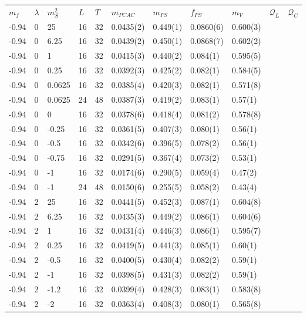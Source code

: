 \begin{table}
\begin{adjustwidth}{-4em}{-4em}
\begin{tabular}{l  l l l l l l l l l l}
\toprule
$m_f$ & $\lambda$ & $m_S^2$ & $L$ & $T$ & $m_{PCAC}$ & $m_{PS}$ & $f_{PS}$ & $m_V$ & $\mathcal Q_L$ & $\mathcal Q_C$ \\ 
\hhline{===========}
-0.94 & 0 & 25 & 16 & 32 & 0.0435(2) & 0.449(1) & 0.0860(6) & 0.600(3) \\
-0.94 & 0 & 6.25 & 16 & 32 & 0.0439(2) & 0.450(1) & 0.0868(7) & 0.602(2)\\
-0.94 & 0 & 1 & 16 & 32 & 0.0415(3) & 0.440(2) & 0.084(1) & 0.595(5)\\
-0.94 & 0 & 0.25 & 16 & 32 & 0.0392(3) & 0.425(2) & 0.082(1) & 0.584(5)\\
-0.94 & 0 & 0.0625 & 16 & 32 & 0.0385(4) & 0.420(3) & 0.082(1) & 0.571(8)\\
-0.94 & 0 & 0.0625 & 24 & 48 & 0.0387(3) & 0.419(2) & 0.083(1) & 0.57(1)\\
-0.94 & 0 & 0 & 16 & 32 & 0.0378(6) & 0.418(4) & 0.081(2) & 0.578(8)\\
-0.94 & 0 & -0.25 & 16 & 32 & 0.0361(5) & 0.407(3) & 0.080(1) & 0.56(1)\\
-0.94 & 0 & -0.5 & 16 & 32 & 0.0342(6) & 0.396(5) & 0.078(2) & 0.56(1)\\
-0.94 & 0 & -0.75 & 16 & 32 & 0.0291(5) & 0.367(4) & 0.073(2) & 0.53(1)\\
-0.94 & 0 & -1 & 16 & 32 & 0.0174(6) & 0.290(5) & 0.059(4) & 0.47(2)\\
-0.94 & 0 & -1 & 24 & 48 & 0.0150(6) & 0.255(5) & 0.058(2) & 0.43(4)\\
\midrule
-0.94 & 2 & 25 & 16 & 32 & 0.0441(5) & 0.452(3) & 0.087(1) & 0.604(8)\\
-0.94 & 2 & 6.25 & 16 & 32 & 0.0435(3) & 0.449(2) & 0.086(1) & 0.604(6)\\
-0.94 & 2 & 1 & 16 & 32 & 0.0431(4) & 0.446(3) & 0.086(1) & 0.595(7)\\
-0.94 & 2 & 0.25 & 16 & 32 & 0.0419(5) & 0.441(3) & 0.085(1) & 0.60(1) \\
-0.94 & 2 & -0.5 & 16 & 32 & 0.0400(5) & 0.430(4) & 0.082(2) & 0.59(1)\\
-0.94 & 2 & -1 & 16 & 32 & 0.0398(5) & 0.431(3) & 0.082(2) & 0.59(1)\\
-0.94 & 2 & -1.2 & 16 & 32 & 0.0399(4) & 0.428(3) & 0.083(1) & 0.583(8)\\
-0.94 & 2 & -2 & 16 & 32 & 0.0363(4) & 0.408(3) & 0.080(1) & 0.565(8)\\

\end{tabular}
\end{adjustwidth}
\end{table}
